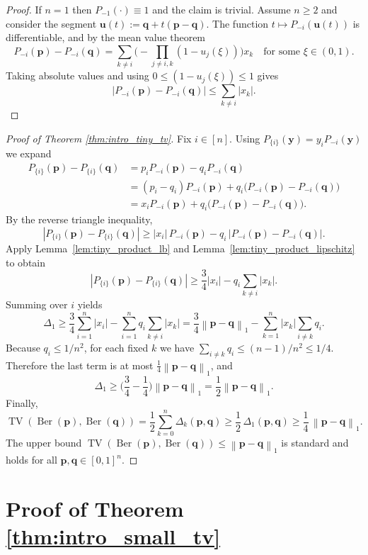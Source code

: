 \documentclass[11pt]{amsart}
\numberwithin{equation}{section}
\theoremstyle{definition}
\newcommand{\TV}{\operatorname{TV}}
\newcommand{\Ber}{\operatorname{Ber}}
\newcommand{\abs}[1]{\left|#1\right|}
\newcommand{\vct}[1]{\mathbf{#1}}
\newcommand{\pvec}{\vct{p}}
\newcommand{\qvec}{\vct{q}}
\newcommand{\yvec}{\vct{y}}
\newcommand{\uvec}{\vct{u}}
\newcommand{\normone}[1]{\left\lVert #1 \right\rVert_1}
\begin{document}
\begin{proof}
If $n=1$ then $P_{-1}(\cdot)\equiv 1$ and the claim is trivial.
Assume $n\ge 2$ and consider the segment $\uvec(t):=\qvec+t(\pvec-\qvec)$.
The function $t\mapsto P_{-i}(\uvec(t)) $ is differentiable, and by the mean value theorem
\[
P_{-i}(\pvec)-P_{-i}(\qvec)=\sum_{k\neq i}\Big(-\prod_{j\neq i,k}(1-u_j(\xi))\Big)x_k\quad\text{for some }\xi\in(0,1).
\]
Taking absolute values and using $0\le (1-u_j(\xi))\le 1$ gives
\[
\abs{P_{-i}(\pvec)-P_{-i}(\qvec)}\le \sum_{k\neq i}\abs{x_k}.
\]
\end{proof}

\begin{proof}[Proof of Theorem \ref{thm:intro_tiny_tv}]
Fix $i\in[n]$.
Using $P_{\{i\}}(\yvec)=y_iP_{-i}(\yvec)$ we expand
\begin{align*}
P_{\{i\}}(\pvec)-P_{\{i\}}(\qvec)
&=p_iP_{-i}(\pvec)-q_iP_{-i}(\qvec)\\
&=(p_i-q_i)P_{-i}(\pvec)+q_i\big(P_{-i}(\pvec)-P_{-i}(\qvec)\big)\\
&=x_iP_{-i}(\pvec)+q_i\big(P_{-i}(\pvec)-P_{-i}(\qvec)\big).
\end{align*}
By the reverse triangle inequality,
\[
\abs{P_{\{i\}}(\pvec)-P_{\{i\}}(\qvec)}
\ge \abs{x_i}\,P_{-i}(\pvec)-q_i\,\abs{P_{-i}(\pvec)-P_{-i}(\qvec)}.
\]
Apply Lemma~\ref{lem:tiny_product_lb} and Lemma~\ref{lem:tiny_product_lipschitz} to obtain
\[
\abs{P_{\{i\}}(\pvec)-P_{\{i\}}(\qvec)}
\ge \frac34\abs{x_i}-q_i\sum_{k\neq i}\abs{x_k}.
\]
Summing over $i$ yields
\[
\Delta_1\ge \frac34\sum_{i=1}^n\abs{x_i}-\sum_{i=1}^n q_i\sum_{k\neq i}\abs{x_k}
=\frac34\normone{\pvec-\qvec}-\sum_{k=1}^n\abs{x_k}\sum_{i\neq k}q_i.
\]
Because $q_i\le 1/n^2$, for each fixed $k$ we have $\sum_{i\neq k}q_i\le (n-1)/n^2\le 1/4$.
Therefore the last term is at most $\tfrac14\normone{\pvec-\qvec}$, and
\[
\Delta_1\ge \Big(\frac34-\frac14\Big)\normone{\pvec-\qvec}=\frac12\normone{\pvec-\qvec}.
\]
Finally,
\[
\TV(\Ber(\pvec),\Ber(\qvec))
=\frac12\sum_{k=0}^n\Delta_k(\pvec,\qvec)
\ge \frac12\,\Delta_1(\pvec,\qvec)
\ge \frac14\,\normone{\pvec-\qvec}.
\]
The upper bound $\TV(\Ber(\pvec),\Ber(\qvec))\le \normone{\pvec-\qvec}$ is standard and holds for all $\pvec,\qvec\in[0,1]^n$.
\end{proof}

\section{Proof of Theorem \ref{thm:intro_small_tv}}
\label{sec:small}
\end{document}
